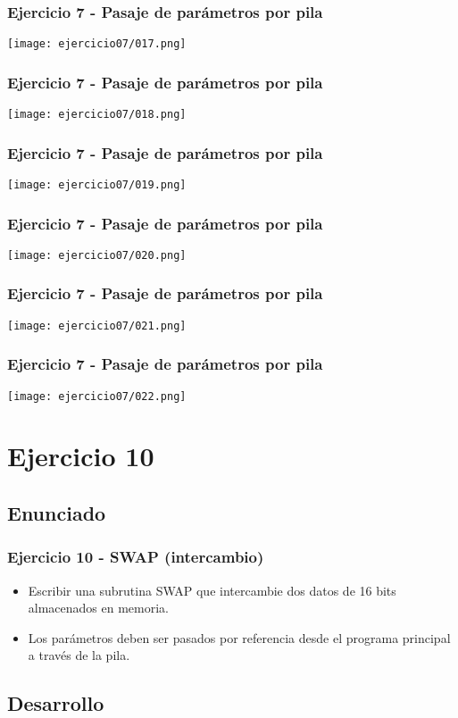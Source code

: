 \documentclass{beamer}
\begin{document}
\begin{frame}
\frametitle{Ejercicio 7 - Pasaje de parámetros por pila}
\texttt{[image: ejercicio07/017.png]}
\end{frame}

\begin{frame}
\frametitle{Ejercicio 7 - Pasaje de parámetros por pila}
\texttt{[image: ejercicio07/018.png]}
\end{frame}

\begin{frame}
\frametitle{Ejercicio 7 - Pasaje de parámetros por pila}
\texttt{[image: ejercicio07/019.png]}
\end{frame}

\begin{frame}
\frametitle{Ejercicio 7 - Pasaje de parámetros por pila}
\texttt{[image: ejercicio07/020.png]}
\end{frame}

\begin{frame}
\frametitle{Ejercicio 7 - Pasaje de parámetros por pila}
\texttt{[image: ejercicio07/021.png]}
\end{frame}

\begin{frame}
\frametitle{Ejercicio 7 - Pasaje de parámetros por pila}
\texttt{[image: ejercicio07/022.png]}
\end{frame}

\section{Ejercicio 10}

\subsection{Enunciado}

\begin{frame}
\frametitle{Ejercicio 10 - SWAP (intercambio) }
\begin{itemize}
\item Escribir una subrutina SWAP que intercambie dos datos de 16 bits almacenados en memoria.
\item Los parámetros deben ser pasados por referencia desde el programa principal a través de la pila.  
\end{itemize}
\end{frame}

\subsection{Desarrollo}
\end{document}
